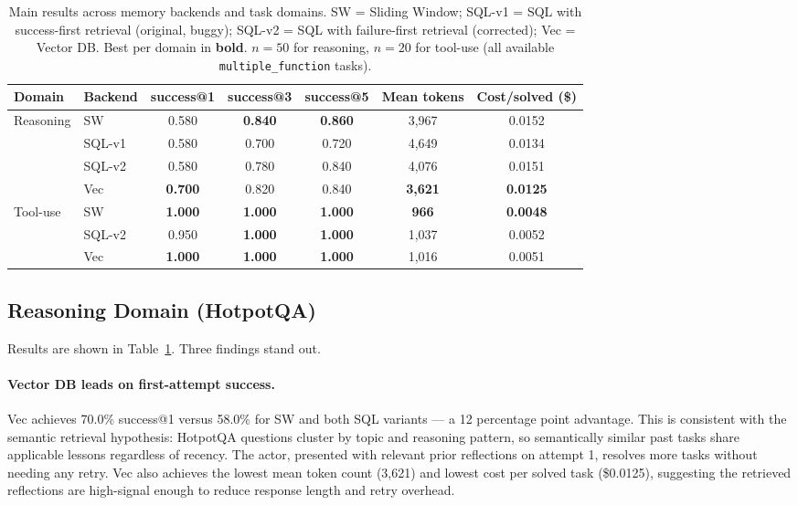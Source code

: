 \documentclass{article}
\begin{document}
\begin{table}[t]
\centering
\caption{
  Main results across memory backends and task domains.
  SW = Sliding Window; SQL-v1 = SQL with success-first retrieval (original,
  buggy); SQL-v2 = SQL with failure-first retrieval (corrected);
  Vec = Vector DB. Best per domain in \textbf{bold}.
  $n{=}50$ for reasoning, $n{=}20$ for tool-use (all available
  \texttt{multiple\_function} tasks).
}
\label{tab:main}
\small
\begin{tabular}{llccccc}
\toprule
Domain & Backend & success@1 & success@3 & success@5 & Mean tokens & Cost/solved (\$) \\
\midrule
\multirow{4}{*}{Reasoning}
  & SW          & 0.580 & \textbf{0.840} & \textbf{0.860} & 3{,}967 & 0.0152 \\
  & SQL-v1      & 0.580 & 0.700          & 0.720          & 4{,}649 & 0.0134 \\
  & SQL-v2      & 0.580 & 0.780          & 0.840          & 4{,}076 & 0.0151 \\
  & Vec         & \textbf{0.700} & 0.820 & 0.840          & \textbf{3{,}621} & \textbf{0.0125} \\
\midrule
\multirow{3}{*}{Tool-use}
  & SW          & \textbf{1.000} & \textbf{1.000} & \textbf{1.000} & \textbf{966}  & \textbf{0.0048} \\
  & SQL-v2      & 0.950          & \textbf{1.000} & \textbf{1.000} & 1{,}037       & 0.0052 \\
  & Vec         & \textbf{1.000} & \textbf{1.000} & \textbf{1.000} & 1{,}016       & 0.0051 \\
\bottomrule
\end{tabular}
\end{table}

\subsection{Reasoning Domain (HotpotQA)}

Results are shown in Table~\ref{tab:main}. Three findings stand out.

\paragraph{Vector DB leads on first-attempt success.}
Vec achieves 70.0\% success@1 versus 58.0\% for SW and both SQL variants ---
a 12 percentage point advantage. This is consistent with the semantic retrieval
hypothesis: HotpotQA questions cluster by topic and reasoning pattern, so
semantically similar past tasks share applicable lessons regardless of recency.
The actor, presented with relevant prior reflections on attempt 1, resolves more
tasks without needing any retry. Vec also achieves the lowest mean token count
(3{,}621) and lowest cost per solved task (\$0.0125), suggesting the retrieved
reflections are high-signal enough to reduce response length and retry overhead.
\end{document}
